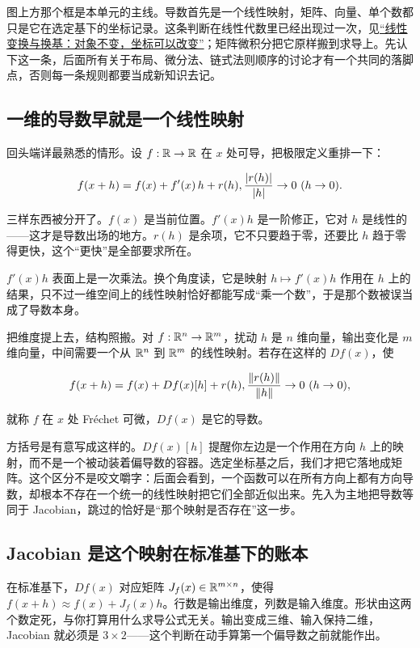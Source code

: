 图上方那个框是本单元的主线。导数首先是一个线性映射，矩阵、向量、单个数都只是它在选定基下的坐标记录。这条判断在线性代数里已经出现过一次，见\hyperref[sec:03-Linear-Algebra/02-Vector-Spaces/04]{``线性变换与换基：对象不变，坐标可以改变''}；矩阵微积分把它原样搬到求导上。先认下这一条，后面所有关于布局、微分法、链式法则顺序的讨论才有一个共同的落脚点，否则每一条规则都要当成新知识去记。

\subsection{一维的导数早就是一个线性映射}

回头端详最熟悉的情形。设 \(f:\mathbb{R}\to\mathbb{R}\) 在 \(x\) 处可导，把极限定义重排一下：

\[
f(x+h)=f(x)+f'(x)\,h+r(h),\space \frac{\left|r(h)\right|}{\left|h\right|}\to 0\ (h\to 0).
\]

三样东西被分开了。\(f(x)\) 是当前位置。\(f'(x)h\) 是一阶修正，它对 \(h\) 是线性的——这才是导数出场的地方。\(r(h)\) 是余项，它不只要趋于零，还要比 \(h\) 趋于零得更快，这个``更快''是全部要求所在。

\(f'(x)h\) 表面上是一次乘法。换个角度读，它是映射 \(h\mapsto f'(x)h\) 作用在 \(h\) 上的结果，只不过一维空间上的线性映射恰好都能写成``乘一个数''，于是那个数被误当成了导数本身。

把维度提上去，结构照搬。对 \(f:\mathbb{R}^n\to\mathbb{R}^m\)，扰动 \(h\) 是 \(n\) 维向量，输出变化是 \(m\) 维向量，中间需要一个从 \(\mathbb{R}^n\) 到 \(\mathbb{R}^m\) 的线性映射。若存在这样的 \(Df(x)\)，使

\[
f(x+h)=f(x)+Df(x)[h]+r(h),
\space
\frac{\left\lVert r(h)\right\rVert}{\left\lVert h\right\rVert}\to 0\ (h\to 0),
\]

就称 \(f\) 在 \(x\) 处 Fréchet 可微，\(Df(x)\) 是它的导数。

方括号是有意写成这样的。\(Df(x)[h]\) 提醒你左边是一个作用在方向 \(h\) 上的映射，而不是一个被动装着偏导数的容器。选定坐标基之后，我们才把它落地成矩阵。这个区分不是咬文嚼字：后面会看到，一个函数可以在所有方向上都有方向导数，却根本不存在一个统一的线性映射把它们全部近似出来。先入为主地把导数等同于 Jacobian，跳过的恰好是``那个映射是否存在''这一步。

\subsection{Jacobian 是这个映射在标准基下的账本}

在标准基下，\(Df(x)\) 对应矩阵 \(J_f(x)\in\mathbb{R}^{m\times n}\)，使得 \(f(x+h)\approx f(x)+J_f(x)h\)。行数是输出维度，列数是输入维度。形状由这两个数定死，与你打算用什么求导公式无关。输出变成三维、输入保持二维，Jacobian 就必须是 \(3\times 2\)——这个判断在动手算第一个偏导数之前就能作出。

